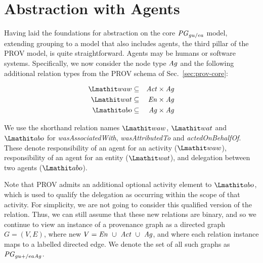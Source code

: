 
\section{Abstraction with Agents}  \label{sec:agents-abstraction}

Having laid the foundations for abstraction on the core $\mathit{PG}_{gu/ea}$ model, extending grouping to a model that also includes agents, the third pillar of the PROV model, is quite straightforward. Agents may be humans or software systems. 
%
Specifically, we now consider the node type $\mathit{Ag}$ and the following additional relation types from the PROV schema of Sec.~\ref{sec:prov-core}:

\begin{eqnarray*}
\waw      & \subseteq & \act \times \ag \\
\attrTo   & \subseteq & \en \times \ag \\
\delegate & \subseteq & \ag \times \ag  
\end{eqnarray*}
%

We use the shorthand relation names $\waw$,  $\attrTo$ and $\delegate$  for \textit{wasAssociatedWith},  \textit{wasAttributedTo} and \textit{actedOnBehalfOf}. These denote responsibility of an agent for an activity ($\waw$), responsibility of an agent for an entity ($\attrTo$), and delegation between two agents ($\delegate$). 
%

Note that PROV admits an additional optional activity element to $\delegate$, which is used to  qualify the delegation as occurring within the scope of that activity. For simplicity, we are not going to consider this qualified version of the relation.
%
Thus, we can still assume that these new relations are binary, and so we continue to view an instance of a provenance graph as a directed graph $G=(V,E)$, where new $V= \mathit{En} ~\cup~ \mathit{Act} ~\cup~ \mathit{Ag}$, and where each relation instance maps to a labelled directed edge.  We denote the set of all such graphs as $\mathit{PG}_{gu+/eaAg}$.

